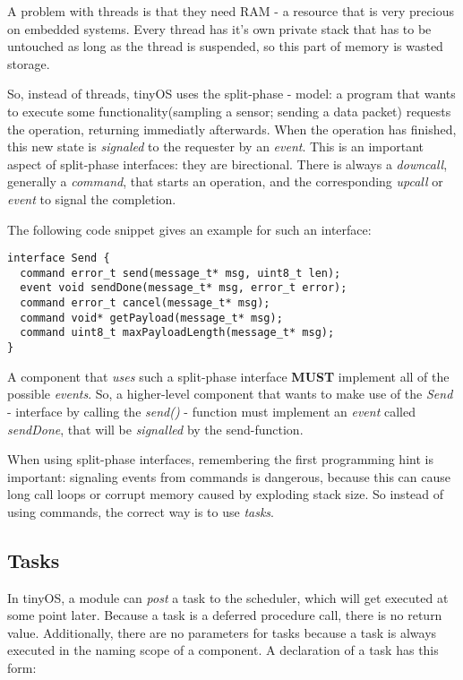 A problem with threads is that they need RAM - a resource that is very precious on embedded systems. Every thread has it's own private stack that has to be untouched as long as the thread is suspended, so this part of memory is wasted storage.

So, instead of threads, tinyOS uses the split-phase - model: a program that wants to execute some functionality(sampling a sensor; sending a data packet) requests the operation, returning immediatly afterwards. When the operation has finished, this new state is \textit{signaled} to the requester by an \textit{event}. This is an important aspect of split-phase interfaces: they are birectional. There is always a \textit{downcall}, generally a \textit{command}, that starts an operation, and the corresponding \textit{upcall} or \textit{event} to signal the completion. 

The following code snippet gives an example for such an interface:

\lstset{language=C}
\begin{lstlisting}
interface Send {
  command error_t send(message_t* msg, uint8_t len);
  event void sendDone(message_t* msg, error_t error);
  command error_t cancel(message_t* msg);
  command void* getPayload(message_t* msg);
  command uint8_t maxPayloadLength(message_t* msg);
}
\end{lstlisting}

A component that \textit{uses} such a split-phase interface \textbf{MUST} implement all of the possible \textit{events}. So, a higher-level component that wants to make use of the \textit{Send} - interface by calling the \textit{send()} - function must implement an \textit{event} called \textit{sendDone}, that will be \textit{signalled} by the send-function.

When using split-phase interfaces, remembering the first programming hint is important: signaling events from commands is dangerous, because this can cause long call loops or corrupt memory caused by exploding stack size.
So instead of using commands, the correct way is to use \textit{tasks}.

\subsection{Tasks}

In tinyOS, a module can \textit{post} a task to the scheduler, which will get executed at some point later. 
Because a task is a deferred procedure call, there is no return value. Additionally, there are no parameters for tasks because a task is always executed in the naming scope of a component. A declaration of a task has this form:

